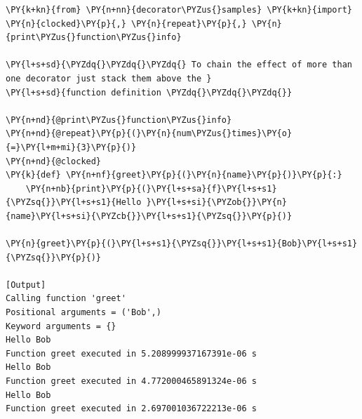 \begin{Verbatim}[label=\makebox{\url{https://github.com/lucabaldini/cmepda/tree/master/slides/latex/snippets/decorator\_chain.py}},commandchars=\\\{\}]
\PY{k+kn}{from} \PY{n+nn}{decorator\PYZus{}samples} \PY{k+kn}{import} \PY{n}{clocked}\PY{p}{,} \PY{n}{repeat}\PY{p}{,} \PY{n}{print\PYZus{}function\PYZus{}info}

\PY{l+s+sd}{\PYZdq{}\PYZdq{}\PYZdq{} To chain the effect of more than one decorator just stack them above the }
\PY{l+s+sd}{function definition \PYZdq{}\PYZdq{}\PYZdq{}}

\PY{n+nd}{@print\PYZus{}function\PYZus{}info}
\PY{n+nd}{@repeat}\PY{p}{(}\PY{n}{num\PYZus{}times}\PY{o}{=}\PY{l+m+mi}{3}\PY{p}{)}
\PY{n+nd}{@clocked}
\PY{k}{def} \PY{n+nf}{greet}\PY{p}{(}\PY{n}{name}\PY{p}{)}\PY{p}{:}
    \PY{n+nb}{print}\PY{p}{(}\PY{l+s+sa}{f}\PY{l+s+s1}{\PYZsq{}}\PY{l+s+s1}{Hello }\PY{l+s+si}{\PYZob{}}\PY{n}{name}\PY{l+s+si}{\PYZcb{}}\PY{l+s+s1}{\PYZsq{}}\PY{p}{)}
    
\PY{n}{greet}\PY{p}{(}\PY{l+s+s1}{\PYZsq{}}\PY{l+s+s1}{Bob}\PY{l+s+s1}{\PYZsq{}}\PY{p}{)}

[Output]
Calling function 'greet'
Positional arguments = ('Bob',)
Keyword arguments = {}
Hello Bob
Function greet executed in 5.208999937167391e-06 s
Hello Bob
Function greet executed in 4.772000465891324e-06 s
Hello Bob
Function greet executed in 2.697001036722213e-06 s
\end{Verbatim}